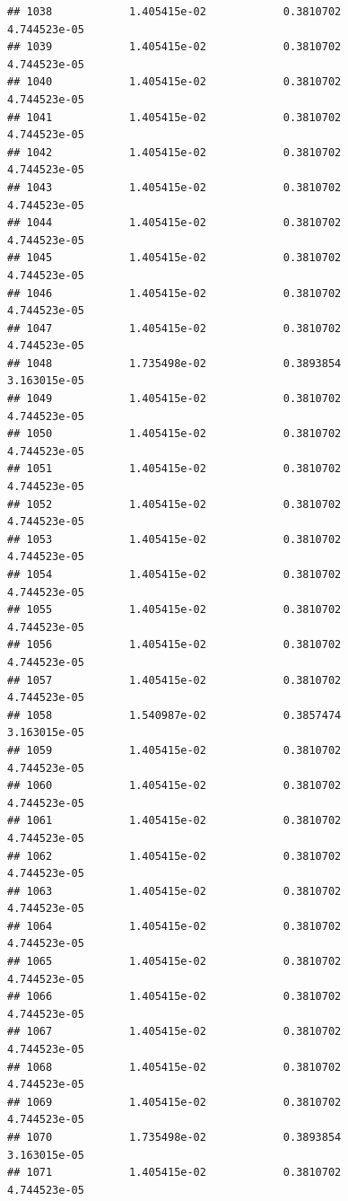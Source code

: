 \documentclass[
]{article}
\begin{document}
\begin{verbatim}
## 1038            1.405415e-02            0.3810702            4.744523e-05
## 1039            1.405415e-02            0.3810702            4.744523e-05
## 1040            1.405415e-02            0.3810702            4.744523e-05
## 1041            1.405415e-02            0.3810702            4.744523e-05
## 1042            1.405415e-02            0.3810702            4.744523e-05
## 1043            1.405415e-02            0.3810702            4.744523e-05
## 1044            1.405415e-02            0.3810702            4.744523e-05
## 1045            1.405415e-02            0.3810702            4.744523e-05
## 1046            1.405415e-02            0.3810702            4.744523e-05
## 1047            1.405415e-02            0.3810702            4.744523e-05
## 1048            1.735498e-02            0.3893854            3.163015e-05
## 1049            1.405415e-02            0.3810702            4.744523e-05
## 1050            1.405415e-02            0.3810702            4.744523e-05
## 1051            1.405415e-02            0.3810702            4.744523e-05
## 1052            1.405415e-02            0.3810702            4.744523e-05
## 1053            1.405415e-02            0.3810702            4.744523e-05
## 1054            1.405415e-02            0.3810702            4.744523e-05
## 1055            1.405415e-02            0.3810702            4.744523e-05
## 1056            1.405415e-02            0.3810702            4.744523e-05
## 1057            1.405415e-02            0.3810702            4.744523e-05
## 1058            1.540987e-02            0.3857474            3.163015e-05
## 1059            1.405415e-02            0.3810702            4.744523e-05
## 1060            1.405415e-02            0.3810702            4.744523e-05
## 1061            1.405415e-02            0.3810702            4.744523e-05
## 1062            1.405415e-02            0.3810702            4.744523e-05
## 1063            1.405415e-02            0.3810702            4.744523e-05
## 1064            1.405415e-02            0.3810702            4.744523e-05
## 1065            1.405415e-02            0.3810702            4.744523e-05
## 1066            1.405415e-02            0.3810702            4.744523e-05
## 1067            1.405415e-02            0.3810702            4.744523e-05
## 1068            1.405415e-02            0.3810702            4.744523e-05
## 1069            1.405415e-02            0.3810702            4.744523e-05
## 1070            1.735498e-02            0.3893854            3.163015e-05
## 1071            1.405415e-02            0.3810702            4.744523e-05

\end{verbatim}
\end{document}
